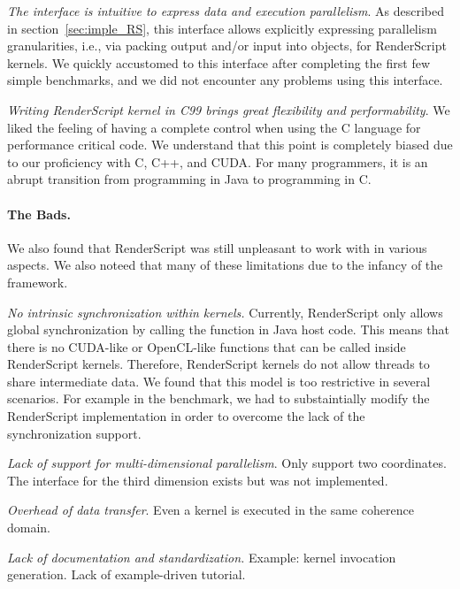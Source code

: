 \textit{The  interface is intuitive to express data and
execution parallelism}. As described in section~\ref{sec:imple_RS}, this
 interface allows explicitly expressing parallelism
granularities, i.e., via packing output and/or input into  objects,
for RenderScript kernels.  We quickly accustomed to this interface
after completing the first few simple benchmarks, and we did not encounter
any problems using this interface.

\textit{Writing RenderScript kernel in C99 brings great flexibility and
performability}. We liked the feeling of having a complete control when using
the C language for performance critical code. We understand that this point is
completely biased due to our proficiency with C, C++, and CUDA. For many
programmers, it is an abrupt transition from programming in Java to programming
in C.


\paragraph{The Bads.} We also found that RenderScript was still unpleasant to work
with in various aspects. We also noteed that many of these limitations due to the
infancy of the framework.

\textit{No intrinsic synchronization within kernels.} Currently, RenderScript
only allows global synchronization by calling the  function in
Java host code. This means that there is no CUDA-like  or
OpenCL-like  functions that can be called inside RenderScript
kernels. Therefore, RenderScript kernels do not allow threads to share
intermediate data. We found that this model is too restrictive in several
scenarios. For example in the  benchmark, we had to substaintially
modify the RenderScript implementation in order to overcome the lack of the
synchronization support.

\textit{Lack of support for multi-dimensional parallelism}. Only support two
coordinates. The interface for the third dimension exists but was not
implemented.

\textit{Overhead of data transfer}. Even a kernel is executed in the same
coherence domain.

\textit{Lack of documentation and standardization.} Example: kernel invocation
generation. Lack of example-driven tutorial.


